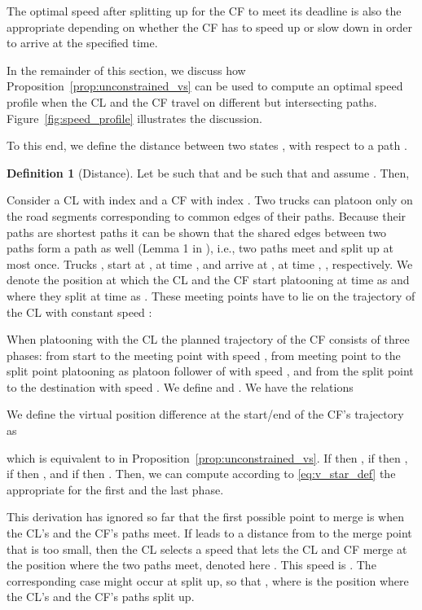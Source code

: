 \documentclass[letterpaper,10pt,conference,twocolumn]{IEEEtran}
\theoremstyle{definition}
\newtheorem{defi}{Definition}
\begin{document}
The optimal speed after splitting up for the CF to meet its deadline is also the appropriate  depending on whether the CF has to speed up or slow down in order to arrive at the specified time. 

In the remainder of this section, we discuss how Proposition~\ref{prop:unconstrained_vs} can be used to compute an optimal speed profile when the CL and the CF travel on different but intersecting paths. Figure~\ref{fig:speed_profile} illustrates the discussion. 

To this end, we define the distance  between two states ,  with respect to a path . 
\begin{defi}[Distance]
Let  be such that  and  be such that  and assume . Then,

\end{defi}
Consider a CL with index  and a CF with index .
Two trucks can platoon only on the road segments corresponding to common edges of their paths. Because their paths are shortest paths it can be shown that the shared edges between two paths form a path as well (Lemma 1 in \cite{ACCpaper}), i.e., two paths meet and split up at most once. Trucks , start at ,  at time ,  and arrive at ,  at time , , respectively.
We denote the position at which the CL and the CF start platooning at time  as  and where they split at time  as . These meeting points have to lie on the trajectory of the CL with constant speed :



When platooning with the CL the planned trajectory of the CF consists of three phases: from start to the meeting point with speed , from meeting point to the split point platooning as platoon follower of  with speed , and from the split point to the destination with speed . We define  and . We have the relations

We define the virtual position difference at the start/end of the CF's trajectory as

which is equivalent to  in Proposition~\ref{prop:unconstrained_vs}. If  then , if  then , if  then , and if  then . Then, we can compute according to \eqref{eq:v_star_def} the appropriate  for the first and the last phase. 

This derivation has ignored so far that the first possible point to merge is when the CL's and the CF's paths meet. If  leads to a distance from  to the merge point that is too small, then the CL selects a speed that lets the CL and CF merge at the position where the two paths meet, denoted here . 
This speed is . The corresponding case might occur at split up, so that , where  is the position where the CL's and the CF's paths split up.
\end{document}

